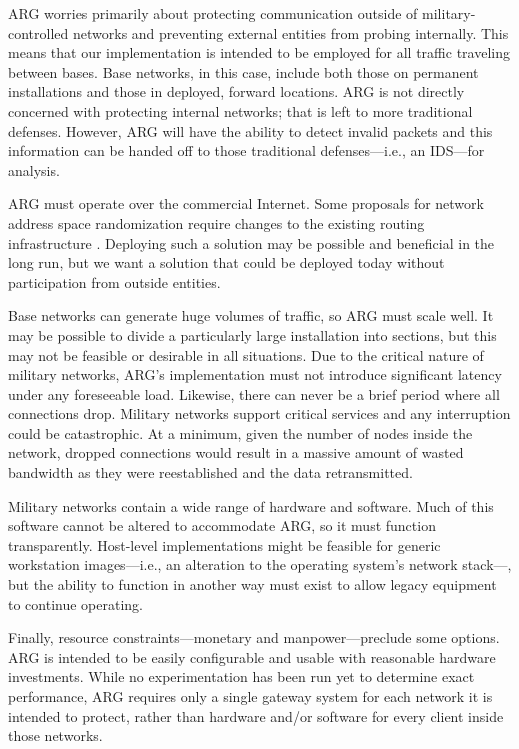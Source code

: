 \par ARG worries primarily about protecting communication outside of military-controlled networks and preventing external entities from probing internally. This means that our implementation is intended to be employed for all traffic traveling between bases. Base networks, in this case, include both those on permanent installations and those in deployed, forward locations. ARG is not directly concerned with protecting internal networks; that is left to more traditional defenses. However, ARG will have the ability to detect invalid packets and this information can be handed off to those traditional defenses---i.e., an IDS---for analysis.

\par ARG must operate over the commercial Internet. Some proposals for network address space randomization require changes to the existing routing infrastructure \cite{CONTRA}. Deploying such a solution may be possible and beneficial in the long run, but we want a solution that could be deployed today without participation from outside entities.

\par Base networks can generate huge volumes of traffic, so ARG must scale well. It may be possible to divide a particularly large installation into sections, but this may not be feasible or desirable in all situations. Due to the critical nature of military networks, ARG's implementation must not introduce significant latency under any foreseeable load. Likewise, there can never be a brief period where all connections drop. Military networks support critical services and any interruption could be catastrophic. At a minimum, given the number of nodes inside the network, dropped connections would result in a massive amount of wasted bandwidth as they were reestablished and the data retransmitted.

\par Military networks contain a wide range of hardware and software. Much of this software cannot be altered to accommodate ARG, so it must function transparently. Host-level implementations might be feasible for generic workstation images---i.e., an alteration to the operating system's network stack---, but the ability to function in another way must exist to allow legacy equipment to continue operating.

\par Finally, resource constraints---monetary and manpower---preclude some options. ARG is intended to be easily configurable and usable with reasonable hardware investments. While no experimentation has been run yet to determine exact performance, ARG requires only a single gateway system for each network it is intended to protect, rather than hardware and/or software for every client inside those networks.



